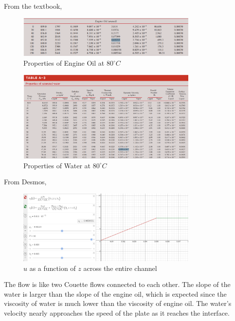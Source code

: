 \subsection{}
From the textbook,
\begin{figure}[h]
    \centering
    \includegraphics[width=0.8\textwidth]{Questions/Figures/Q3 Engine Oil Properties.png}
    \caption{Properties of Engine Oil at $80^\circ C$}
\end{figure}
\begin{figure}[h]
    \centering
    \includegraphics[width=0.8\textwidth]{Questions/Figures/Q3 Water Properties.png}
    \caption{Properties of Water at $80^\circ C$}
\end{figure}
From Desmos,
\begin{figure}[h]
    \centering
    \includegraphics[width=0.8\textwidth]{Questions/Figures/Q3 Plot.png}
    \caption{$u$ as a function of $z$ across the entire channel}
\end{figure}
The flow is like two Couette flows connected to each other. The slope of the water is larger than the slope of the engine oil, which is expected since the viscosity of water is much lower than the viscosity of engine oil. The water's velocity nearly approaches the speed of the plate as it reaches the interface. 